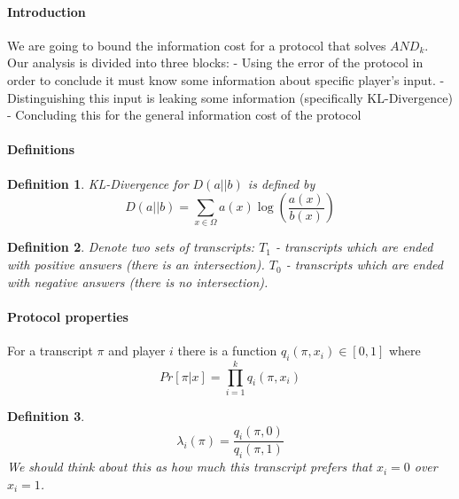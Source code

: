 \documentclass{article}
\theoremstyle{plain}
\newtheorem{definition}{Definition}
\begin{document}
\paragraph{Introduction}
We are going to bound the information cost for a protocol that solves $AND_k$. Our analysis is divided into three blocks:  - Using the error of the protocol in order to conclude it must know some information about specific player's input.  - Distinguishing this input is leaking some information (specifically KL-Divergence)  - Concluding this for the general information cost of the protocol \newline
\paragraph{Definitions}

\begin{definition}
KL-Divergence for $D(a || b)$ is defined by
\begin{equation*} 
    D(a || b) = \sum_{x \in \Omega} a(x)\log \left(\frac{a(x)}{b(x)}\right)
\end{equation*}
\end{definition}

\begin{definition}
    Denote two sets of transcripts: \newline
    $T_1$ - transcripts which are ended with positive answers (there is an intersection). \newline
    $T_0$ - transcripts which are ended with negative answers (there is no intersection).
\end{definition}

\paragraph{Protocol properties}
For a transcript $\pi$ and player $i$ there is a function $q_i(\pi, x_i) \in [0,1]$ where
\begin{equation*}
    Pr[\pi | x] = \prod_{i=1}^{k}q_i(\pi, x_i )
\end{equation*}

\begin{definition}
\begin{equation*}
    \lambda _i (\pi) = \frac{q_i(\pi, 0)}{q_i(\pi, 1)}
\end{equation*}
We should think about this as how much this transcript prefers that $x_i = 0$ over $x_i = 1$.
\end{definition}
\end{document}
